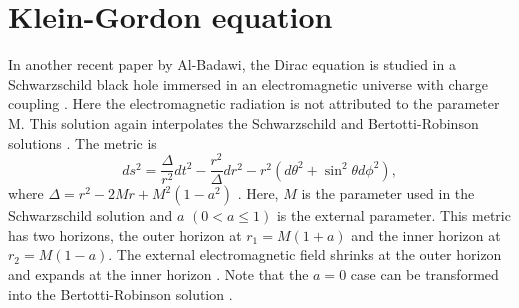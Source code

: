 \documentclass{article}
\begin{document}
\section{Klein-Gordon equation}
In another recent paper by Al-Badawi, the Dirac equation is studied in a Schwarzschild
black hole immersed in an electromagnetic universe with charge coupling \cite{Badawi2}. Here the electromagnetic radiation is not attributed to the parameter M. This solution again interpolates the Schwarzschild \cite{Sch} and Bertotti-Robinson \cite{Bert,Rob} solutions \cite{Badawi2}. The metric is
\begin{equation}
ds^{2}=\frac{\Delta }{r^{2}}dt^{2}-\frac{r^{2}}{\Delta }dr^{2}-r^{2}\left(
d\theta ^{2}+\sin ^{2}\theta d\phi ^{2}\right) ,
\end{equation}
where $\Delta =r^{2}-2Mr+M^{2}\left( 1-a^{2}\right)$
\cite{halilbadawi,Ovgun} . Here, $M$ is the parameter
used in the Schwarzschild solution and $a$ $(0<a\leq 1)$
is the external parameter. This metric has two horizons, the outer
horizon  at $ r_{1} = M(1+a)$ and the inner horizon  at $ r_{2} =
M(1-a) $. The external electromagnetic field shrinks at the outer
horizon and expands at the inner horizon \cite{halilbadawi}. Note
that the $a=0$ case can be transformed into the Bertotti-Robinson
solution \cite{Ovgun}.
\end{document}
